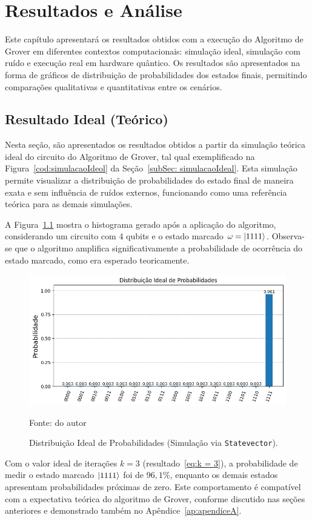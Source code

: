 \chapter{Resultados e Análise}
\label{chap:resultados}

Este capítulo apresentará os resultados obtidos com a execução do Algoritmo de Grover em diferentes contextos computacionais: simulação ideal, simulação com ruído e execução real em hardware quântico. Os resultados são apresentados na forma de gráficos de distribuição de probabilidades dos estados finais, permitindo comparações qualitativas e quantitativas entre os cenários.

\section{Resultado Ideal (Teórico)}
\label{sec: resultIdeal}

Nesta seção, são apresentados os resultados obtidos a partir da simulação teórica ideal do circuito do Algoritmo de Grover, tal qual exemplificado na Figura~\ref{cod:simulacaoIdeol} da Seção~\ref{subSec: simulacaoIdeal}. Esta simulação permite visualizar a distribuição de probabilidades do estado final de maneira exata e sem influência de ruídos externos, funcionando como uma referência teórica para as demais simulações.

A Figura~\ref{fig:resultIdeal} mostra o histograma gerado após a aplicação do algoritmo, considerando um circuito com $4$ qubits e o estado marcado $\omega = \ket{1111}$. Observa-se que o algoritmo amplifica significativamente a probabilidade de ocorrência do estado marcado, como era esperado teoricamente.

\begin{figure}[ht!]
    \centering
    \captionsetup{justification=centering}
    \caption{ Distribuição Ideal de Probabilidades (Simulação via \texttt{Statevector}).}
    \label{fig:resultIdeal}
    \includegraphics[width=.5\linewidth]{Imagens/resultIdeal.png}    
    
    {\small Fonte: do autor} 
\end{figure}

Com o valor ideal de iterações $k=3$ (resultado~\ref{eq:k = 3}), a probabilidade de medir o estado marcado $\ket{1111}$ foi de $96,1\%$, enquanto os demais estados apresentam probabilidades próximas de zero. Este comportamento é compatível com a expectativa teórica do algoritmo de Grover, conforme discutido nas seções anteriores e demonstrado também no Apêndice~\ref{ap:apendiceA}.

